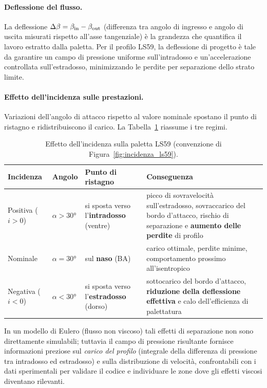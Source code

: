 \paragraph{Deflessione del flusso.}
La deflessione $\Delta\beta = \beta_{\rm in} - \beta_{\rm out}$ (differenza tra angolo di
ingresso e angolo di uscita misurati rispetto all'asse tangenziale) è la grandezza che
quantifica il lavoro estratto dalla paletta. Per il profilo LS59, la deflessione di progetto
è tale da garantire un campo di pressione uniforme sull'intradosso e un'accelerazione
controllata sull'estradosso, minimizzando le perdite per separazione dello strato limite.

\paragraph{Effetto dell'incidenza sulle prestazioni.}
Variazioni dell'angolo di attacco rispetto al valore nominale spostano il punto di ristagno e
ridistribuiscono il carico. La Tabella~\ref{tab:incidenza_ls59} riassume i tre regimi.

\begin{table}[H]
  \centering
  \caption{Effetto dell'incidenza sulla paletta LS59 (convenzione di Figura~\ref{fig:incidenza_ls59}).}
  \label{tab:incidenza_ls59}
  \renewcommand{\arraystretch}{1.3}
  \begin{tabular}{p{2.4cm} p{1.6cm} p{3.0cm} p{4.6cm}}
    \toprule
    \textbf{Incidenza} & \textbf{Angolo} & \textbf{Punto di ristagno} & \textbf{Conseguenza} \\
    \midrule
    Positiva ($i>0$) & $\alpha > 30°$ & si sposta verso l'\textbf{intradosso} (ventre) &
      picco di sovravelocità sull'estradosso, sovraccarico del bordo d'attacco, rischio di
      separazione e \textbf{aumento delle perdite} di profilo \\
    Nominale & $\alpha = 30°$ & sul \textbf{naso} (BA) &
      carico ottimale, perdite minime, comportamento prossimo all'isentropico \\
    Negativa ($i<0$) & $\alpha < 30°$ & si sposta verso l'\textbf{estradosso} (dorso) &
      sottocarico del bordo d'attacco, \textbf{riduzione della deflessione effettiva} e calo
      dell'efficienza di palettatura \\
    \bottomrule
  \end{tabular}
\end{table}

In un modello di Eulero (flusso non viscoso) tali effetti di separazione non sono
direttamente simulabili; tuttavia il campo di pressione risultante fornisce informazioni
preziose sul \emph{carico del profilo} (integrale della differenza di pressione tra
intradosso ed estradosso) e sulla distribuzione di velocità, confrontabili con i dati
sperimentali per validare il codice e individuare le zone dove gli effetti viscosi diventano
rilevanti.

